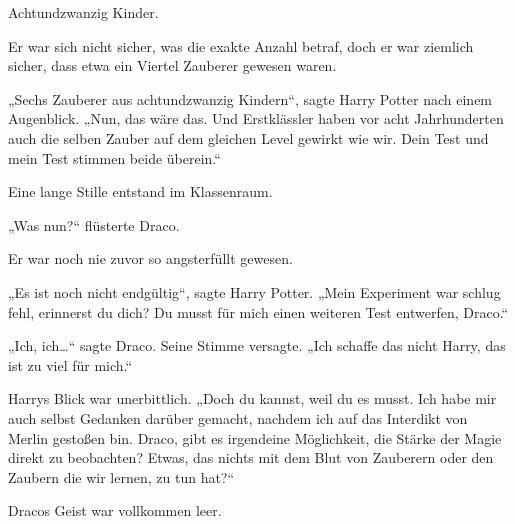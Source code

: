 Achtundzwanzig Kinder.

Er war sich nicht sicher, was die exakte Anzahl betraf, doch er war ziemlich sicher, dass etwa ein Viertel Zauberer gewesen waren.

„Sechs Zauberer aus achtundzwanzig Kindern“, sagte Harry Potter nach einem Augenblick. „Nun, das wäre das. Und Erstklässler haben vor acht Jahrhunderten auch die selben Zauber auf dem gleichen Level gewirkt wie wir. Dein Test und mein Test stimmen beide überein.“

Eine lange Stille entstand im Klassenraum.

„Was nun?“ flüsterte Draco.

Er war noch nie zuvor so angsterfüllt gewesen.

„Es ist noch nicht endgültig“, sagte Harry Potter. „Mein Experiment war schlug fehl, erinnerst du dich? Du musst für mich einen weiteren Test entwerfen, Draco.“

„Ich, ich…“ sagte Draco. Seine Stimme versagte. „Ich schaffe das nicht Harry, das ist zu viel für mich.“

Harrys Blick war unerbittlich. „Doch du kannst, weil du es musst. Ich habe mir auch selbst Gedanken darüber gemacht, nachdem ich auf das Interdikt von Merlin gestoßen bin. Draco, gibt es irgendeine Möglichkeit, die Stärke der Magie direkt zu beobachten? Etwas, das nichts mit dem Blut von Zauberern oder den Zaubern die wir lernen, zu tun hat?“

Dracos Geist war vollkommen leer.

